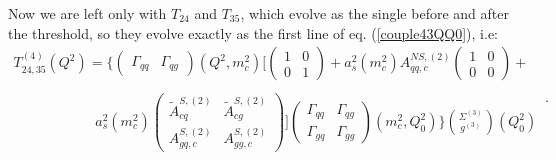 \documentclass[10pt,a4paper]{article}
\begin{document}
Now we are left only with $T_{24}$ and $T_{35}$, which evolve as the
single before and after the threshold, so they evolve exactly as the
first line of eq. (\ref{couple43QQ0}), i.e:
\begin{equation}
\begin{array}{l}
\displaystyle T_{24,35}^{(4)}(Q^2)= \Bigg\{\begin{pmatrix} \Gamma_{qq} & \Gamma_{qg} \end{pmatrix}(Q^2,m_c^2)\Bigg[\begin{pmatrix} 1 & 0 \\ 0 & 1\end{pmatrix}+a_s^2(m_c^2)A_{qq,c}^{N\!S,(2)}\begin{pmatrix} 1 & 0 \\ 0 & 0\end{pmatrix}+\\
\\
\hspace{70pt}\displaystyle a_s^2(m_c^2)\begin{pmatrix} \tilde{A}^{S,(2)}_{cq} & \tilde{A}^{S,(2)}_{cg} \\A^{S,(2)}_{gq,c} & A_{gg,c}^{S,(2)}\end{pmatrix}\Bigg]\begin{pmatrix} \Gamma_{qq} & \Gamma_{qg} \\ \Gamma_{gq}& \Gamma_{gg}\end{pmatrix}(m_c^2,Q_0^2)\Bigg\}{\Sigma^{(3)} \choose g^{(3)}}(Q_0^2)
\end{array}\,.
\end{equation}
\end{document}

